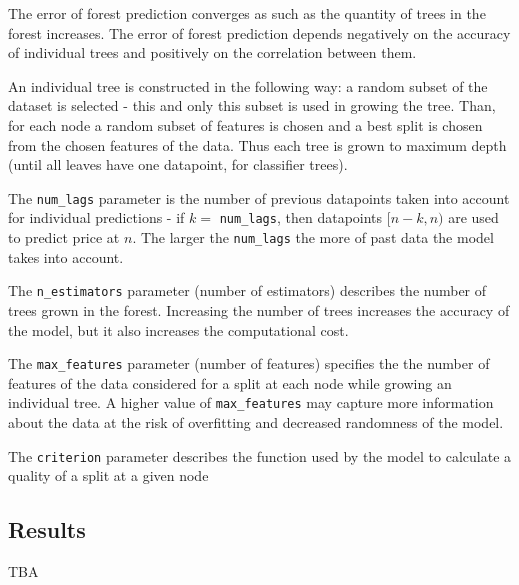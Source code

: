 The error of forest prediction converges as such as the quantity of trees in the forest increases. The error of forest prediction depends negatively on the accuracy of individual trees and positively on the correlation between them.

An individual tree is constructed in the following way: a random subset of the dataset is selected - this and only this subset is used in growing the tree. Than, for each node a random subset of features is chosen and a best split is chosen from the chosen features of the data. Thus each tree is grown to maximum depth (until all leaves have one datapoint, for classifier trees).

The \verb|num_lags| parameter is the number of previous datapoints taken into account for individual predictions - if \(k=\) \verb|num_lags|, then datapoints \([n-k, n)\) are used to predict price at \(n\). The larger the \verb|num_lags| the more of past data the model takes into account.

The \verb|n_estimators| parameter (number of estimators) describes the number of trees grown in the forest. Increasing the number of trees increases the accuracy of the model, but it also increases the computational cost.

The \verb|max_features| parameter (number of features) specifies the the number of features of the data considered for a split at each node while growing an individual tree. A higher value of \verb|max_features| may capture more information about the data at the risk of overfitting and decreased randomness of the model.

The \verb|criterion| parameter describes the function used by the model to calculate a quality of a split at a given node



\subsection{Results}
TBA

